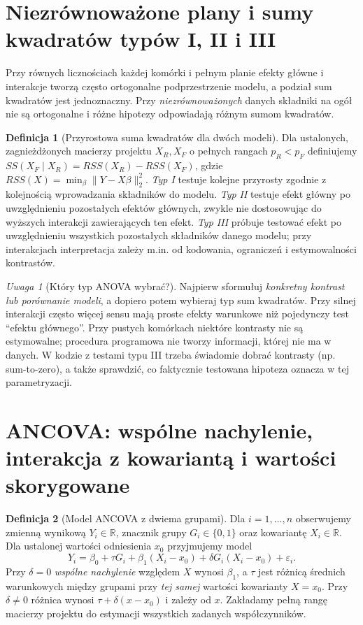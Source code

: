 \documentclass[11pt,a4paper,oneside]{report}
\numberwithin{equation}{chapter}
\theoremstyle{plain}
\theoremstyle{definition}
\newtheorem{definicja}{Definicja}[chapter]
\theoremstyle{remark}
\newtheorem{uwaga}{Uwaga}[chapter]
\newcommand{\R}{\mathbb R}
\begin{document}
\section{Niezrównoważone plany i sumy kwadratów typów I, II i III}
Przy równych licznościach każdej komórki i pełnym planie efekty główne i interakcje tworzą często ortogonalne podprzestrzenie modelu, a podział sum kwadratów jest jednoznaczny. Przy \emph{niezrównoważonych} danych składniki na ogół nie są ortogonalne i różne hipotezy odpowiadają różnym sumom kwadratów.

\begin{definicja}[Przyrostowa suma kwadratów dla dwóch modeli]\label{def:partial-ss}
Dla ustalonych, zagnieżdżonych macierzy projektu $X_R,X_F$ o pełnych rangach $p_R<p_F$ definiujemy $SS(X_F\mid X_R)=RSS(X_R)-RSS(X_F)$, gdzie $RSS(X)=\min_\beta\|Y-X\beta\|_2^2$. \emph{Typ I} testuje kolejne przyrosty zgodnie z kolejnością wprowadzania składników do modelu. \emph{Typ II} testuje efekt główny po uwzględnieniu pozostałych efektów głównych, zwykle nie dostosowując do wyższych interakcji zawierających ten efekt. \emph{Typ III} próbuje testować efekt po uwzględnieniu wszystkich pozostałych składników danego modelu; przy interakcjach interpretacja zależy m.in. od kodowania, ograniczeń i estymowalności kontrastów.
\end{definicja}

\begin{uwaga}[Który typ ANOVA wybrać?]
Najpierw sformułuj \emph{konkretny kontrast lub porównanie modeli}, a dopiero potem wybieraj typ sum kwadratów. Przy silnej interakcji często więcej sensu mają proste efekty warunkowe niż pojedynczy test ``efektu głównego''. Przy pustych komórkach niektóre kontrasty nie są estymowalne; procedura programowa nie tworzy informacji, której nie ma w danych. W kodzie z testami typu III trzeba świadomie dobrać kontrasty (np. sum-to-zero), a także sprawdzić, co faktycznie testowana hipoteza oznacza w tej parametryzacji.
\end{uwaga}

\section{ANCOVA: wspólne nachylenie, interakcja z kowariantą i wartości skorygowane}
\begin{definicja}[Model ANCOVA z dwiema grupami]\label{def:ancova}
Dla $i=1,\ldots,n$ obserwujemy zmienną wynikową $Y_i\in\R$, znacznik grupy $G_i\in\{0,1\}$ oraz kowariantę $X_i\in\R$. Dla ustalonej wartości odniesienia $x_0$ przyjmujemy model
\[
 Y_i=\beta_0+\tau G_i+\beta_1(X_i-x_0)+\delta G_i(X_i-x_0)+\varepsilon_i.
\]
Przy $\delta=0$ \emph{wspólne nachylenie} względem $X$ wynosi $\beta_1$, a $\tau$ jest różnicą średnich warunkowych między grupami przy \emph{tej samej} wartości kowarianty $X=x_0$. Przy $\delta\ne0$ różnica wynosi $\tau+\delta(x-x_0)$ i zależy od $x$. Zakładamy pełną rangę macierzy projektu do estymacji wszystkich zadanych współczynników.
\end{definicja}
\end{document}
